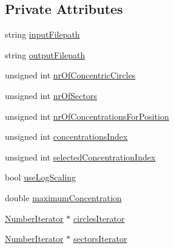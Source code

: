 \subsection*{Private Attributes}
\begin{DoxyCompactItemize}
\item 
string \hyperlink{classmultiscale_1_1video_1_1PolarCsvToInputFilesConverter_a7b33b6d00b5e0d809f4fb0d76985ab59}{input\-Filepath}
\item 
string \hyperlink{classmultiscale_1_1video_1_1PolarCsvToInputFilesConverter_a1033d31c9bfc7ccad08337c7b0fa6e6e}{output\-Filepath}
\item 
unsigned int \hyperlink{classmultiscale_1_1video_1_1PolarCsvToInputFilesConverter_a7aa37d18880e822369cbe118a093e24f}{nr\-Of\-Concentric\-Circles}
\item 
unsigned int \hyperlink{classmultiscale_1_1video_1_1PolarCsvToInputFilesConverter_a9246a2c9749602af145d5579bde8a9d1}{nr\-Of\-Sectors}
\item 
unsigned int \hyperlink{classmultiscale_1_1video_1_1PolarCsvToInputFilesConverter_a3a9301788514c50c295ca113a4114938}{nr\-Of\-Concentrations\-For\-Position}
\item 
unsigned int \hyperlink{classmultiscale_1_1video_1_1PolarCsvToInputFilesConverter_afd9f17e6ba2dc46b920ab28538278362}{concentrations\-Index}
\item 
unsigned int \hyperlink{classmultiscale_1_1video_1_1PolarCsvToInputFilesConverter_a121d592659f9f5075c8c78aa46c2950c}{selected\-Concentration\-Index}
\item 
bool \hyperlink{classmultiscale_1_1video_1_1PolarCsvToInputFilesConverter_af07bf56fc39bb226a6e2596f35ada0d7}{use\-Log\-Scaling}
\item 
double \hyperlink{classmultiscale_1_1video_1_1PolarCsvToInputFilesConverter_a89b7dce2825cd5c8c45a1e6f19770e5f}{maximum\-Concentration}
\item 
\hyperlink{classmultiscale_1_1NumberIterator}{Number\-Iterator} $\ast$ \hyperlink{classmultiscale_1_1video_1_1PolarCsvToInputFilesConverter_ad4cf12c7f3951f0bb388939797cbcc0c}{circles\-Iterator}
\item 
\hyperlink{classmultiscale_1_1NumberIterator}{Number\-Iterator} $\ast$ \hyperlink{classmultiscale_1_1video_1_1PolarCsvToInputFilesConverter_aa6895c1613a551cd05195f05ae51862b}{sectors\-Iterator}
\end{DoxyCompactItemize}
